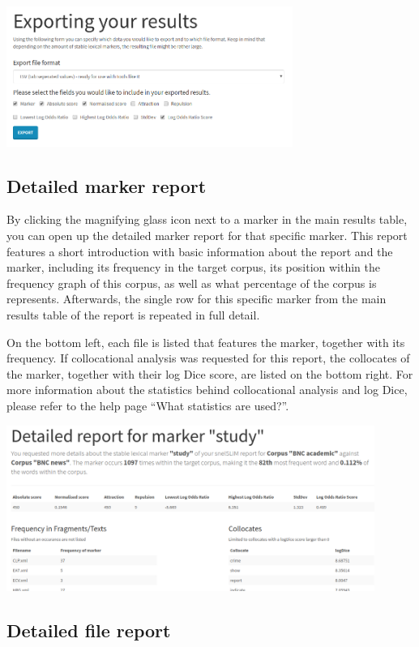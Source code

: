 \documentclass[11pt,a4paper]{article}
\begin{document}
\centerline{\includegraphics[width=0.7\textwidth]{images/exportresults.png}}

\subsection{Detailed marker report}

By clicking the magnifying glass icon next to a marker in the main results table, you can open up the detailed marker report for that specific marker. This report features a short introduction with basic information about the report and the marker, including its frequency in the target corpus, its position within the frequency graph of this corpus, as well as what percentage of the corpus is represents. Afterwards, the single row for this specific marker from the main results table of the report is repeated in full detail.

On the bottom left, each file is listed that features the marker, together with its frequency. If collocational analysis was requested for this report, the collocates of the marker, together with their log Dice score, are listed on the bottom right. For more information about the statistics behind collocational analysis and log Dice, please refer to the help page ``What statistics are used?''.

\centerline{\includegraphics[width=0.9\textwidth]{images/keyreport.png}}

\subsection{Detailed file report}
\end{document}
